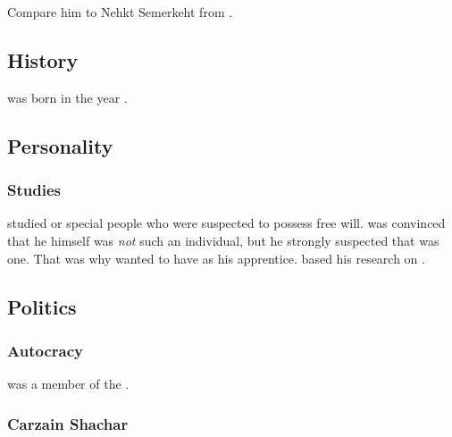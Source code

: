 Compare him to Nehkt Semerkeht from \cite{RobertEHoward:NehktSemerkeht}. 









\subsection{History}
\ZeethanKraal was born in the year .









\subsection{Personality}





\subsubsection{Studies}
\Kraal studied  or \dash special people who were suspected to possess free will. 
\Kraal was convinced that he himself was \emph{not} such an individual, but he strongly suspected that \CarzainShachar was one. 
That was why \Kraal wanted to have \Shachar as his apprentice. 
\Kraal based his research on . 









\subsection{Politics}





\subsubsection{\Caisith Autocracy}
\Kraal was a member of the . 





\subsubsection{Carzain Shachar}

